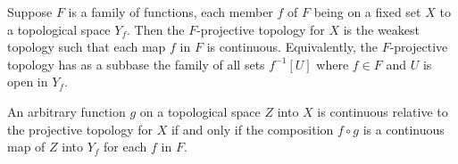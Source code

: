 Suppose $F$ is a family of functions, each member $f$ of $F$ being on a fixed set $X$ to a topological space $Y_f$. Then the $F$-projective topology for $X$ is the weakest topology such that each map $f$ in $F$ is continuous. Equivalently, the $F$-projective topology has as a subbase the family of all sets $f^{-1}[U]$ where $f \in F$ and $U$ is open in $Y_f$.

An arbitrary function $g$ on a topological space $Z$ into $X$ is continuous relative to the projective topology for $X$ if and only if the composition $f \circ g$ is a continuous map of $Z$ into $Y_f$ for each $f$ in $F$.
